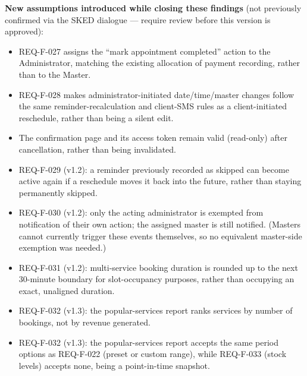 \documentclass[11pt,a4paper]{article}
\begin{document}
\medskip

\noindent
\textbf{New assumptions introduced while closing these findings}
(not previously confirmed via the SKED dialogue --- require review before
this version is approved):

\begin{itemize}[leftmargin=1.2cm]

\item
REQ-F-027 assigns the ``mark appointment completed'' action to the
Administrator, matching the existing allocation of payment recording,
rather than to the Master.

\item
REQ-F-028 makes administrator-initiated date/time/master changes follow
the same reminder-recalculation and client-SMS rules as a client-initiated
reschedule, rather than being a silent edit.

\item
The confirmation page and its access token remain valid (read-only) after
cancellation, rather than being invalidated.

\item
REQ-F-029 (v1.2): a reminder previously recorded as skipped can become
active again if a reschedule moves it back into the future, rather than
staying permanently skipped.

\item
REQ-F-030 (v1.2): only the acting administrator is exempted from
notification of their own action; the assigned master is still notified.
(Masters cannot currently trigger these events themselves, so no
equivalent master-side exemption was needed.)

\item
REQ-F-031 (v1.2): multi-service booking duration is rounded up to the next
30-minute boundary for slot-occupancy purposes, rather than occupying an
exact, unaligned duration.

\item
REQ-F-032 (v1.3): the popular-services report ranks services by number of
bookings, not by revenue generated.

\item
REQ-F-032 (v1.3): the popular-services report accepts the same period
options as REQ-F-022 (preset or custom range), while REQ-F-033
(stock levels) accepts none, being a point-in-time snapshot.

\end{itemize}

\tableofcontents
\end{document}
